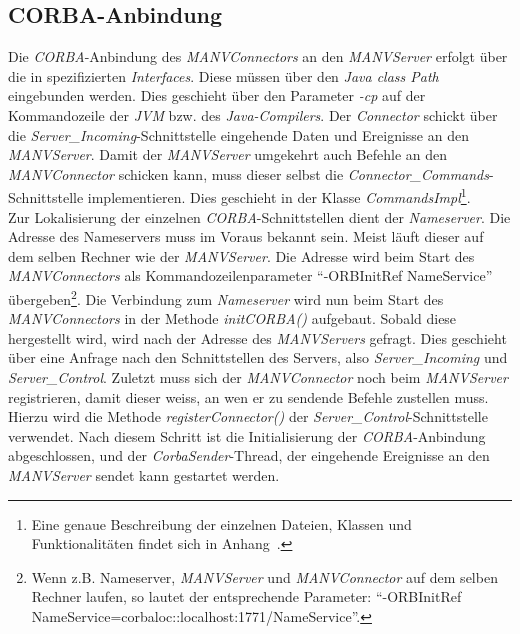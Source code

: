 \subsection{CORBA-Anbindung}
Die \emph{CORBA}-Anbindung des \emph{MANVConnectors} an den \emph{MANVServer} erfolgt über
die in \cite{Jan} spezifizierten \emph{Interfaces}. Diese müssen über den \emph{Java class Path}
eingebunden werden. Dies geschieht über den Parameter \emph{-cp} auf der Kommandozeile
der \emph{JVM} bzw. des \emph{Java-Compilers}. Der \emph{Connector} schickt über die 
\emph{Server\_Incoming}-Schnittstelle eingehende Daten und Ereignisse an den \emph{MANVServer}.
Damit der \emph{MANVServer} umgekehrt auch Befehle an den \emph{MANVConnector} schicken kann,
muss dieser selbst die \emph{Connector\_Commands}-Schnittstelle implementieren. Dies
geschieht in der Klasse \emph{CommandsImpl}\footnote{Eine
genaue Beschreibung der einzelnen Dateien, Klassen und Funktionalitäten findet sich in
Anhang~\label{anhang_beschreibung_software}.}.\\

Zur Lokalisierung der einzelnen \emph{CORBA}-Schnittstellen dient der \emph{Nameserver}.
Die Adresse des Nameservers muss im Voraus bekannt sein. Meist läuft dieser auf dem selben Rechner
wie der \emph{MANVServer}. Die Adresse wird beim Start des \emph{MANVConnectors} als 
Kommandozeilenparameter "`-ORBInitRef NameService"' übergeben\footnote{Wenn z.B. Nameserver, \emph{MANVServer}
und \emph{MANVConnector} auf dem selben Rechner laufen, so lautet der entsprechende Parameter:
"`-ORBInitRef NameService=corbaloc::localhost:1771/NameService"'.}. Die Verbindung zum \emph{Nameserver}
wird nun beim Start des \emph{MANVConnectors} in der Methode \emph{initCORBA()} aufgebaut. 
Sobald diese hergestellt wird, wird nach der Adresse des \emph{MANVServers} gefragt. Dies geschieht über
eine Anfrage nach den Schnittstellen des Servers, also \emph{Server\_Incoming} und \emph{Server\_Control}. 
Zuletzt muss sich der \emph{MANVConnector} noch beim \emph{MANVServer} registrieren, damit dieser
weiss, an wen er zu sendende Befehle zustellen muss. Hierzu wird die Methode \emph{registerConnector()}
der \emph{Server\_Control}-Schnittstelle verwendet. Nach diesem Schritt ist die Initialisierung der
\emph{CORBA}-Anbindung abgeschlossen, und der \emph{CorbaSender}-Thread, der eingehende Ereignisse
an den \emph{MANVServer} sendet kann gestartet werden.
